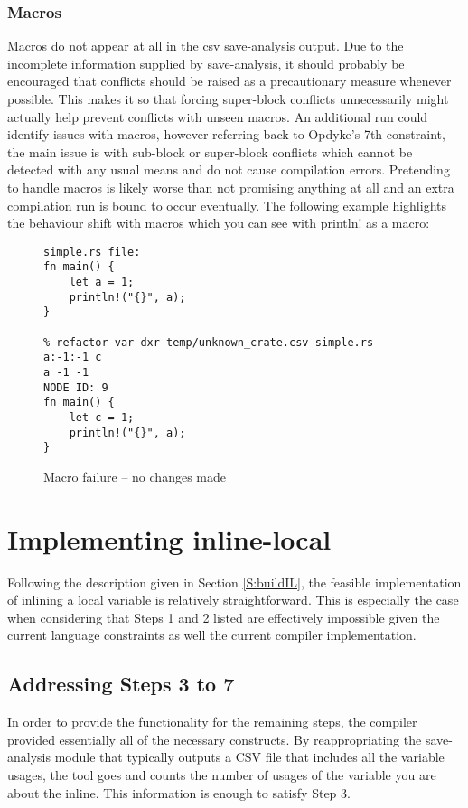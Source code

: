 \subsubsection{Macros}
Macros do not appear at all in the csv save-analysis output. Due to the incomplete information supplied by save-analysis, it should probably be encouraged that conflicts should be raised as a precautionary measure whenever possible. This makes it so that forcing super-block conflicts unnecessarily might actually help prevent conflicts with unseen macros. An additional run could identify issues with macros, however referring back to Opdyke's 7th constraint, the main issue is with sub-block or super-block conflicts which cannot be detected with any usual means and do not cause compilation errors. Pretending to handle macros is likely worse than not promising anything at all and an extra compilation run is bound to occur eventually. The following example highlights the behaviour shift with macros which you can see with println! as a macro:

\begin{figure}[H]
\centering
\begin{verbatim}
simple.rs file:
fn main() {
    let a = 1;
    println!("{}", a);
}

% refactor var dxr-temp/unknown_crate.csv simple.rs  a:-1:-1 c
a -1 -1
NODE ID: 9
fn main() {
    let c = 1;
    println!("{}", a);
}
\end{verbatim}
\caption{Macro failure -- no changes made}
\end{figure}

\section{Implementing inline-local}\label{S:ill}
Following the description given in Section \ref{S:buildIL}, the feasible implementation of inlining a local variable is relatively straightforward. This is especially the case when considering that Steps 1 and 2 listed are effectively impossible given the current language constraints as well the current compiler implementation.

\subsection{Addressing Steps 3 to 7}
In order to provide the functionality for the remaining steps, the compiler provided essentially all of the necessary constructs. By reappropriating the save-analysis module that typically outputs a CSV file that includes all the variable usages, the tool goes and counts the number of usages of the variable you are about the inline. This information is enough to satisfy Step 3.

